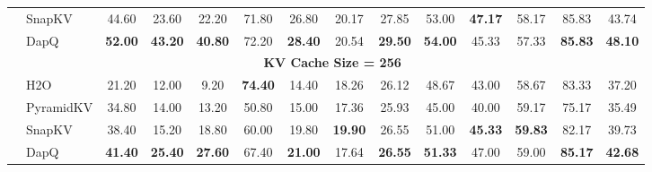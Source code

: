 \begin{table}[!htbp]
{\begin{tabular}{l l *{12}{c}}
& SnapKV & 44.60 & 23.60 & 22.20 & 71.80 & 26.80 & 20.17 & 27.85 & 53.00 & \textbf{47.17} & 58.17 & 85.83 & 43.74 \\
& DapQ & \textbf{52.00} & \textbf{43.20} & \textbf{40.80} & 72.20 & \textbf{28.40} & 20.54 & \textbf{29.50} & \textbf{54.00} & 45.33 & 57.33 & \textbf{85.83} & \textbf{48.10} \\
\cmidrule{2-14}
& \multicolumn{13}{c}{\cellcolor{gray!20}\textbf{KV Cache Size = 256}} \\
& H2O & 21.20 & 12.00 & 9.20 & \textbf{74.40} & 14.40 & 18.26 & 26.12 & 48.67 & 43.00 & 58.67 & 83.33 & 37.20 \\
& PyramidKV & 34.80 & 14.00 & 13.20 & 50.80 & 15.00 & 17.36 & 25.93 & 45.00 & 40.00 & 59.17 & 75.17 & 35.49 \\
& SnapKV & 38.40 & 15.20 & 18.80 & 60.00 & 19.80 & \textbf{19.90} & 26.55 & 51.00 & \textbf{45.33} & \textbf{59.83} & 82.17 & 39.73 \\
& DapQ & \textbf{41.40} & \textbf{25.40} & \textbf{27.60} & 67.40 & \textbf{21.00} & 17.64 & \textbf{26.55} & \textbf{51.33} & 47.00 & 59.00 & \textbf{85.17} & \textbf{42.68} \\
\bottomrule
\end{tabular}
}
\label{table:helmet}
\end{table}

% 
